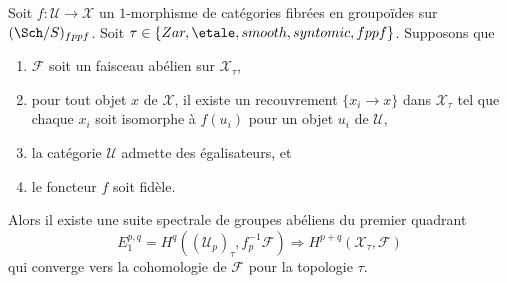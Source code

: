 \begin{lemma}
\label{lemma-cech-to-cohomology}
Soit $f : \mathcal{U} \to \mathcal{X}$ un $1$-morphisme de catégories fibrées
en groupoïdes sur $(\Sch/S)_{fppf}$. Soit
$\tau \in \{Zar, \etale, smooth, syntomic, fppf\}$.
Supposons que
\begin{enumerate}
\item $\mathcal{F}$ soit un faisceau abélien sur $\mathcal{X}_\tau$,
\item pour tout objet $x$ de $\mathcal{X}$, il existe un recouvrement
$\{x_i \to x\}$ dans $\mathcal{X}_\tau$ tel que chaque $x_i$ soit isomorphe
à $f(u_i)$ pour un objet $u_i$ de $\mathcal{U}$,
\item la catégorie $\mathcal{U}$ admette des égalisateurs, et
\item le foncteur $f$ soit fidèle.
\end{enumerate}
Alors il existe une suite spectrale de groupes abéliens du premier quadrant
$$
E_1^{p, q} = H^q((\mathcal{U}_p)_\tau, f_p^{-1}\mathcal{F})
\Rightarrow
H^{p + q}(\mathcal{X}_\tau, \mathcal{F})
$$
qui converge vers la cohomologie de $\mathcal{F}$ pour la topologie $\tau$.
\end{lemma}

